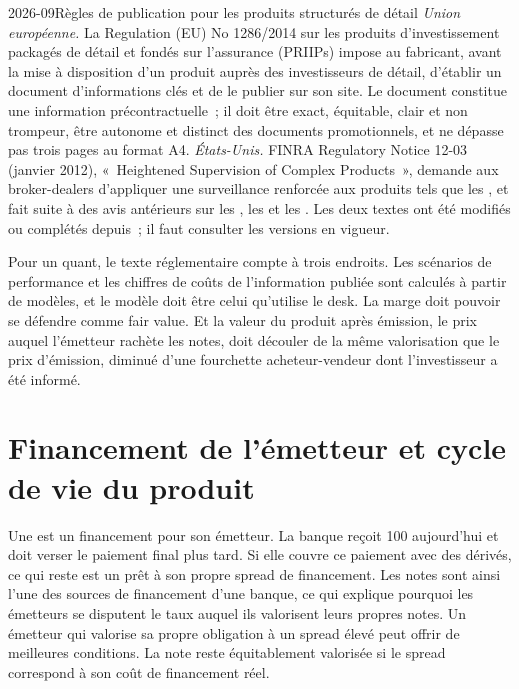 \begin{dated}{2026-09}{Règles de publication pour les produits structurés de détail}\label{dat:dv:the-structured-products-business:rules}
\emph{Union européenne.} La Regulation (EU) No 1286/2014 sur les produits d'investissement packagés de détail et fondés sur l'assurance (PRIIPs) impose
au fabricant, avant la mise à disposition d'un produit auprès des investisseurs de détail, d'établir un document d'informations clés et de le publier sur
son site. Le document constitue une information précontractuelle~; il doit être exact, équitable, clair et non trompeur, être autonome et distinct
des documents promotionnels, et ne dépasse pas trois pages au format A4. \emph{États-Unis.} FINRA Regulatory Notice 12-03 (janvier
2012), «~Heightened Supervision of Complex Products~», demande aux broker-dealers d'appliquer une surveillance renforcée aux produits tels que
les , et fait suite à des avis antérieurs sur les , les  et les . Les deux textes
ont été modifiés ou complétés depuis~; il faut consulter les versions en vigueur.
\end{dated}

Pour un quant, le texte réglementaire compte à trois endroits. Les scénarios de performance et les chiffres de coûts de l'information publiée sont calculés à partir
de modèles, et le modèle doit être celui qu'utilise le desk. La marge doit pouvoir se défendre comme fair value. Et la valeur du produit après émission,
le prix auquel l'émetteur rachète les notes, doit découler de la même valorisation que le prix d'émission, diminué d'une fourchette acheteur-vendeur dont
l'investisseur a été informé.

\section{Financement de l'émetteur et cycle de vie du produit}

Une  est un financement pour son émetteur. La banque reçoit 100 aujourd'hui et doit verser le paiement final plus tard. Si elle couvre ce paiement avec
des dérivés, ce qui reste est un prêt à son propre spread de financement. Les notes sont ainsi l'une des sources de financement d'une banque, ce qui explique pourquoi
les émetteurs se disputent le taux auquel ils valorisent leurs propres notes. Un émetteur qui valorise sa propre obligation à un spread élevé peut offrir de meilleures
conditions. La note reste équitablement valorisée si le spread correspond à son coût de financement réel.

